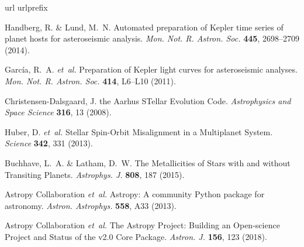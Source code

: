 \begin{thebibliography}{99}
\makeatletter
\addtocounter{\@listctr}{51}
\makeatother
\expandafter\ifx\csname url\endcsname\relax
\def\url#1{\texttt{#1}}\fi
\expandafter\ifx\csname urlprefix\endcsname\relax\def\urlprefix{URL }\fi
\providecommand{\bibinfo}[2]{#2}
\providecommand{\eprint}[2][]{\url{#2}}


\bibinfo{author}{Handberg, R.} \& \bibinfo{author}{Lund, M.~N.}
\newblock \bibinfo{title}{Automated preparation of {{Kepler}} time series of
	planet hosts for asteroseismic analysis}.
\newblock \emph{\bibinfo{journal}{Mon. Not. R. Astron. Soc.}}
\textbf{\bibinfo{volume}{445}}, \bibinfo{pages}{2698--2709}
(\bibinfo{year}{2014}).

\bibinfo{author}{Garc{\'i}a, R.~A.} \emph{et~al.}
\newblock \bibinfo{title}{Preparation of {{Kepler}} light curves for
	asteroseismic analyses}.
\newblock \emph{\bibinfo{journal}{Mon. Not. R. Astron. Soc.}}
\textbf{\bibinfo{volume}{414}}, \bibinfo{pages}{L6--L10}
(\bibinfo{year}{2011}).

\bibinfo{author}{{Christensen-Dalsgaard}, J.}
\newblock \bibinfo{title}{{{ASTEC}}\textemdash the {{Aarhus STellar Evolution
			Code}}}.
\newblock \emph{\bibinfo{journal}{Astrophysics and Space Science}}
\textbf{\bibinfo{volume}{316}}, \bibinfo{pages}{13} (\bibinfo{year}{2008}).

\bibinfo{author}{Huber, D.} \emph{et~al.}
\newblock \bibinfo{title}{Stellar {{Spin}}-{{Orbit Misalignment}} in a
	{{Multiplanet System}}}.
\newblock \emph{\bibinfo{journal}{Science}} \textbf{\bibinfo{volume}{342}},
\bibinfo{pages}{331} (\bibinfo{year}{2013}).

\bibinfo{author}{Buchhave, L.~A.} \& \bibinfo{author}{Latham, D.~W.}
\newblock \bibinfo{title}{The {{Metallicities}} of {{Stars}} with and without
	{{Transiting Planets}}}.
\newblock \emph{\bibinfo{journal}{Astrophys. J.}}
\textbf{\bibinfo{volume}{808}}, \bibinfo{pages}{187} (\bibinfo{year}{2015}).

\bibinfo{author}{{Astropy Collaboration}} \emph{et~al.}
\newblock \bibinfo{title}{Astropy: {{A}} community {{Python}} package for
	astronomy}.
\newblock \emph{\bibinfo{journal}{Astron. Astrophys.}}
\textbf{\bibinfo{volume}{558}}, \bibinfo{pages}{A33} (\bibinfo{year}{2013}).

\bibinfo{author}{{Astropy Collaboration}} \emph{et~al.}
\newblock \bibinfo{title}{The {{Astropy Project}}: {{Building}} an
	{{Open}}-science {{Project}} and {{Status}} of the v2.0 {{Core Package}}}.
\newblock \emph{\bibinfo{journal}{Astron. J.}} \textbf{\bibinfo{volume}{156}},
\bibinfo{pages}{123} (\bibinfo{year}{2018}).


\end{thebibliography}

